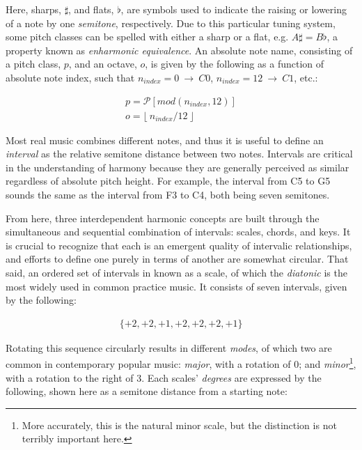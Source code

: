 Here, sharps, $\sharp$, and flats, $\flat$, are symbols used to indicate the raising or lowering of a note by one \emph{semitone}, respectively.
Due to this particular tuning system, some pitch classes can be spelled with either a sharp or a flat, e.g. $A\sharp = B\flat$, a property known as \emph{enharmonic equivalence}.
An absolute note name, consisting of a pitch class, $p$, and an octave, $o$, is given by the following as a function of absolute note index, such that $n_{index}=0~\to~C0$, $n_{index}=12~\to~C1$, etc.:

\begin{align*}
p = \mathcal{P}[mod(n_{index}, 12)] \\
o = \lfloor~n_{index} / 12~\rfloor
\end{align*}

Most real music combines different notes, and thus it is useful to define an \emph{interval} as the relative semitone distance between two notes.
Intervals are critical in the understanding of harmony because they are generally perceived as similar regardless of absolute pitch height.
For example, the interval from C5 to G5 sounds the same as the interval from F3 to C4, both being seven semitones.

From here, three interdependent harmonic concepts are built through the simultaneous and sequential combination of intervals: scales, chords, and keys.
It is crucial to recognize that each is an emergent quality of intervalic relationships, and efforts to define one purely in terms of another are somewhat circular.
That said, an ordered set of intervals in known as a scale, of which the \emph{diatonic} is the most widely used in common practice music.
It consists of seven intervals, given by the following:

\begin{align*}
\{+2, +2, +1, +2, +2, +2, +1\}
\end{align*}

Rotating this sequence circularly results in different \emph{modes}, of which two are common in contemporary popular music: \emph{major}, with a rotation of 0; and \emph{minor}\footnote{More accurately, this is the natural minor scale, but the distinction is not terribly important here.}, with a rotation to the right of 3.
Each scales' \emph{degrees} are expressed by the following, shown here as a semitone distance from a starting note:

